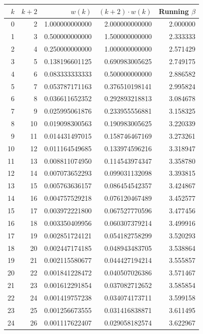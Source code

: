 \documentclass[12pt,a4paper]{article}
\theoremstyle{definition}
\begin{document}
{%
\small
\begin{longtable}{rr@{\quad}r@{\quad}r@{\quad}r}
\toprule
$k$ & $k{+}2$ & $w(k)$ & $(k{+}2)\cdot w(k)$ & Running $\beta$ \\
\midrule
\endhead
 0 &  2 & 1.000000000000 & 2.000000000000 & 2.000000 \\
 1 &  3 & 0.500000000000 & 1.500000000000 & 2.333333 \\
 2 &  4 & 0.250000000000 & 1.000000000000 & 2.571429 \\
 3 &  5 & 0.138196601125 & 0.690983005625 & 2.749175 \\
 4 &  6 & 0.083333333333 & 0.500000000000 & 2.886582 \\
 5 &  7 & 0.053787171163 & 0.376510198141 & 2.995824 \\
 6 &  8 & 0.036611652352 & 0.292893218813 & 3.084678 \\
 7 &  9 & 0.025995061876 & 0.233955556881 & 3.158325 \\
 8 & 10 & 0.019098300563 & 0.190983005625 & 3.220339 \\
 9 & 11 & 0.014431497015 & 0.158746467169 & 3.273261 \\
10 & 12 & 0.011164549685 & 0.133974596216 & 3.318947 \\
11 & 13 & 0.008811074950 & 0.114543974347 & 3.358780 \\
12 & 14 & 0.007073652293 & 0.099031132098 & 3.393815 \\
13 & 15 & 0.005763636157 & 0.086454542357 & 3.424867 \\
14 & 16 & 0.004757529218 & 0.076120467489 & 3.452577 \\
15 & 17 & 0.003972221800 & 0.067527770596 & 3.477456 \\
16 & 18 & 0.003350409956 & 0.060307379214 & 3.499916 \\
17 & 19 & 0.002851724121 & 0.054182758299 & 3.520293 \\
18 & 20 & 0.002447174185 & 0.048943483705 & 3.538864 \\
19 & 21 & 0.002115580677 & 0.044427194214 & 3.555857 \\
20 & 22 & 0.001841228472 & 0.040507026386 & 3.571467 \\
21 & 23 & 0.001612291854 & 0.037082712652 & 3.585854 \\
22 & 24 & 0.001419757238 & 0.034074173711 & 3.599158 \\
23 & 25 & 0.001256673555 & 0.031416838871 & 3.611495 \\
24 & 26 & 0.001117622407 & 0.029058182574 & 3.622967 \\

\end{longtable}}
\end{document}
